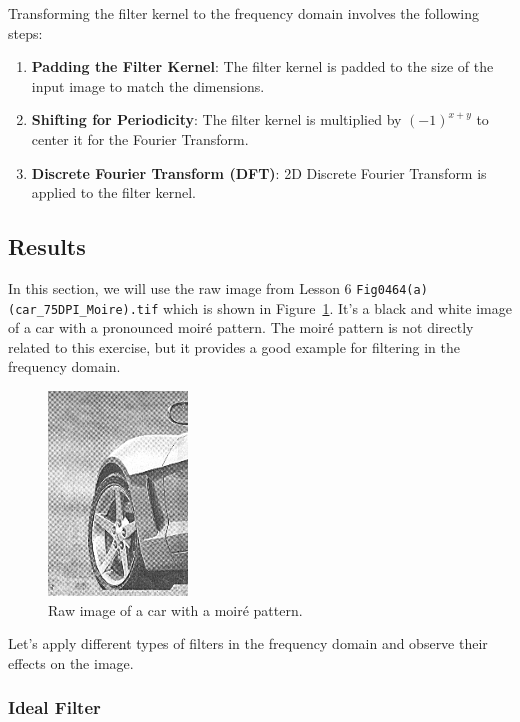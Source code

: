 \documentclass[a4paper,12pt]{article}
\begin{document}
Transforming the filter kernel to the frequency domain involves the following steps:

\begin{enumerate}
    \item \textbf{Padding the Filter Kernel}:
        The filter kernel is padded to the size of the input image to match the dimensions.
    \item \textbf{Shifting for Periodicity}:
        The filter kernel is multiplied by \( (-1)^{x + y} \) to center it for the Fourier Transform.
    \item \textbf{Discrete Fourier Transform (DFT)}:
        2D Discrete Fourier Transform is applied to the filter kernel.
\end{enumerate}

\subsection{Results}

In this section, we will use the raw image from Lesson 6 \texttt{Fig0464(a)(car\_75DPI\_Moire).tif} which is shown in Figure~\ref{fig:car-75dpi-moire}. It's a black and white image of a car with a pronounced moiré pattern. The moiré pattern is not directly related to this exercise, but it provides a good example for filtering in the frequency domain.

\begin{figure}
    \centering
    \includegraphics[width=0.33\textwidth]{data/input/Fig0464(a)(car_75DPI_Moire).png}
    \caption{\label{fig:car-75dpi-moire} Raw image of a car with a moiré pattern.}
\end{figure}

Let's apply different types of filters in the frequency domain and observe their effects on the image.

\subsubsection{Ideal Filter}
\end{document}
